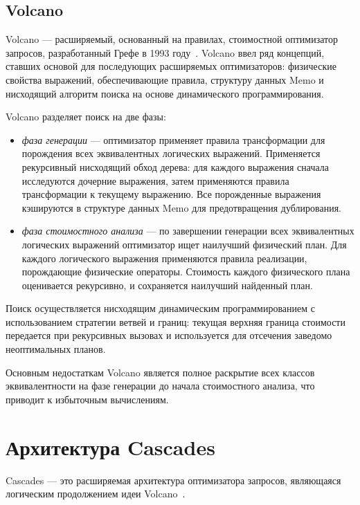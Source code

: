 \documentclass[fontsize=14pt, russian]{scrartcl}
\begin{document}
\subsection{Volcano}

Volcano --- расширяемый, основанный на правилах, стоимостной оптимизатор
запросов, разработанный Грефе в 1993 году~\cite{GraefeMcKenna1993}. Volcano ввел
ряд концепций, ставших основой для последующих расширяемых оптимизаторов:
физические свойства выражений, обеспечивающие правила, структуру данных Memo и
нисходящий алгоритм поиска на основе динамического программирования.

Volcano разделяет поиск на две фазы:

\begin{itemize}
  \item \emph{фаза генерации} --- оптимизатор применяет правила трансформации
        для порождения всех эквивалентных логических выражений. Применяется
        рекурсивный нисходящий обход дерева: для каждого выражения сначала
        исследуются дочерние выражения, затем применяются правила трансформации
        к текущему выражению. Все порожденные выражения кэшируются в структуре
        данных Memo для предотвращения дублирования.

  \item \emph{фаза стоимостного анализа} --- по завершении генерации всех
        эквивалентных логических выражений оптимизатор ищет наилучший физический
        план. Для каждого логического выражения применяются правила реализации,
        порождающие физические операторы. Стоимость каждого физического плана
        оценивается рекурсивно, и сохраняется наилучший найденный план.
\end{itemize}

Поиск осуществляется нисходящим динамическим программированием с использованием
стратегии ветвей и границ: текущая верхняя граница стоимости передается при
рекурсивных вызовах и используется для отсечения заведомо неоптимальных планов.

Основным недостаткам Volcano является полное раскрытие всех классов
эквивалентности на фазе генерации до начала стоимостного анализа, что приводит к
избыточным вычислениям.

\section{Архитектура Cascades}

Cascades --- это расширяемая архитектура оптимизатора запросов, являющаяся
логическим продолжением идеи Volcano~\cite{Graefe1995}.
\end{document}
